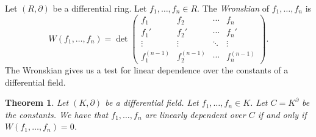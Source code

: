 \documentclass[]{book}
\numberwithin{equation}{section}
\newtheorem{theorem}{Theorem}[subsection]
\theoremstyle{definition}
\theoremstyle{remark}
\begin{document}
Let $(R,\partial)$ be a differential ring. 
Let $f_1,\ldots,f_n\in R$. 
The \emph{Wronskian} of $f_1,\ldots,f_n$ is 
 $$ W(f_1,\ldots,f_n) = \det \begin{pmatrix}
 f_1 & f_2 & \cdots & f_n \\
 f_1' & f_2' & \cdots & f_n' \\
 \vdots & \vdots & \ddots & \vdots \\
 f_1^{(n-1)} & f_2^{(n-1)} & \cdots & f_n^{(n-1)}
 \end{pmatrix}.$$
The Wronskian gives us a test for linear dependence over the constants of a differential field. 
\begin{theorem}
	Let $(K,\partial)$ be a differential field. 
	Let $f_1,\ldots,f_n \in K$. 
	Let $C = K^{\partial}$ be the constants. 
	We have that $f_1,\ldots,f_n$ are linearly dependent over $C$ if and only if $W(f_1,\ldots,f_n)=0$. 
\end{theorem}
\end{document}
